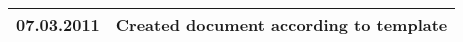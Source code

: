 \begin{table}[H]
		\begin{tabular}{| c | p{10cm} | }
    		\hline
			07.03.2011		&	Created document according to template		\\
			\hline
    	\end{tabular}
	\label{tab:changelog}
\end{table}